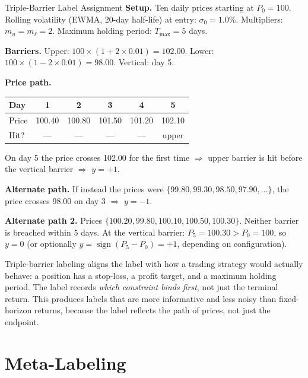 \begin{workedexample}{Triple-Barrier Label Assignment}
\textbf{Setup.} Ten daily prices starting at $P_0 = 100$.
Rolling volatility (EWMA, 20-day half-life) at entry: $\sigma_0 = 1.0\%$.
Multipliers: $m_u = m_\ell = 2$.
Maximum holding period: $T_{\max} = 5$ days.

\textbf{Barriers.}
Upper: $100 \times (1 + 2 \times 0.01) = 102.00$.
Lower: $100 \times (1 - 2 \times 0.01) = 98.00$.
Vertical: day 5.

\textbf{Price path.}
\begin{center}
\begin{tabular}{lccccc}
\toprule
Day & 1 & 2 & 3 & 4 & 5 \\
\midrule
Price & 100.40 & 100.80 & 101.50 & 101.20 & 102.10 \\
Hit? & --- & --- & --- & --- & upper \\
\bottomrule
\end{tabular}
\end{center}

On day 5 the price crosses 102.00 for the first time $\Rightarrow$
upper barrier is hit before the vertical barrier $\Rightarrow$ $y = +1$.

\textbf{Alternate path.}
If instead the prices were $\{99.80, 99.30, 98.50, 97.90, \ldots\}$,
the price crosses 98.00 on day 3 $\Rightarrow$ $y = -1$.

\textbf{Alternate path 2.}
Prices $\{100.20, 99.80, 100.10, 100.50, 100.30\}$.
Neither barrier is breached within 5 days.
At the vertical barrier: $P_5 = 100.30 > P_0 = 100$, so $y = 0$
(or optionally $y = \operatorname{sign}(P_5 - P_0) = +1$, depending
on configuration).
\end{workedexample}

\begin{keyidea}
Triple-barrier labeling aligns the label with how a trading strategy
would actually behave: a position has a stop-loss, a profit target,
and a maximum holding period.
The label records \emph{which constraint binds first}, not just the
terminal return.
This produces labels that are more informative and less noisy than
fixed-horizon returns, because the label reflects the path of prices,
not just the endpoint.
\end{keyidea}


\section{Meta-Labeling}
\label{sec:meta-labeling}

